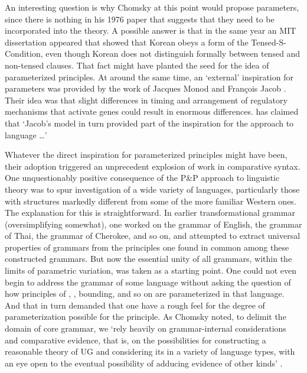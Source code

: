 \documentclass[output=paper,
modfonts
]{LSP/langsci}
\begin{document}
An interesting question is why Chomsky at this point would propose
parameters, since there is nothing in his 1976 paper that suggests that
they need to be incorporated into the theory. A possible answer is that
in the same year an MIT dissertation appeared \citep{kim1976} that showed
that Korean obeys a form of the Tensed-S-Condition, even though Korean
does not distinguish formally between tensed and non-tensed clauses.
That fact might have planted the seed for the idea of parameterized
principles. At around the same time, an `external' inspiration for
parameters was provided by the work of Jacques Monod and François Jacob
\citep{monod1972,jacob1977}. Their idea was that slight differences in
timing and arrangement of regulatory mechanisms that activate genes
could result in enormous differences.  \citet[28]{berwick2011n}
has claimed that `Jacob's model in turn provided part of the
inspiration for the  approach to
language \ldots{}'

Whatever the direct inspiration for parameterized principles might have
been, their adoption triggered an unprecedent explosion of work in
comparative syntax. One unquestionably positive consequence of the P\&P
approach to linguistic theory was to spur investigation of a wide
variety of languages, particularly those with structures markedly
different from some of the more familiar Western ones. The explanation
for this is straightforward. In earlier transformational grammar
(oversimplifying somewhat), one worked on the grammar of English, the
grammar of Thai, the grammar of Cherokee, and so on, and attempted to
extract universal properties of grammars from the principles one found
in common among these constructed grammars. But now the essential unity
of all grammars, within the limits of parametric variation, was taken as
a starting point. One could not even begin to address the grammar
of some language without asking the question of how principles of ,
, bounding, and so on are parameterized in that language. And
that in turn demanded that one have a rough feel for the degree of
parameterization possible for the principle. As Chomsky noted, to
delimit the domain of core grammar, we `rely heavily on grammar-internal
considerations and comparative evidence, that is, on the possibilities
for constructing a reasonable theory of UG and considering its
 in a variety of language types, with an eye open to
the eventual possibility of adducing evidence of other kinds' \citep[9]{chomsky1981}.
\end{document}
